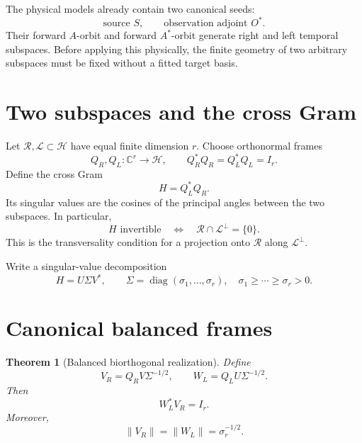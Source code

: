 \documentclass[12pt]{article}
\newtheorem{theorem}{Theorem}[section]
\theoremstyle{remark}
\newcommand{\cH}{\mathcal H}
\newcommand{\cR}{\mathcal R}
\newcommand{\cL}{\mathcal L}
\newcommand{\norm}[1]{\left\lVert#1\right\rVert}
\begin{document}
The physical models already contain two canonical seeds:
\begin{equation}\label{eq:seeds}
 \text{source }S,
 \qquad
 \text{observation adjoint }O^*.
\end{equation}
Their forward $A$-orbit and forward $A^*$-orbit generate right and left
temporal subspaces.  Before applying this physically, the finite geometry of
two arbitrary subspaces must be fixed without a fitted target basis.

\section{Two subspaces and the cross Gram}

Let $\cR,\cL\subset\cH$ have equal finite dimension $r$.  Choose orthonormal
frames
\begin{equation}\label{eq:orthogonal-frames}
 Q_R,Q_L:\mathbb C^r\longrightarrow\cH,
 \qquad Q_R^*Q_R=Q_L^*Q_L=I_r.
\end{equation}
Define the cross Gram
\begin{equation}\label{eq:cross-gram}
 H=Q_L^*Q_R.
\end{equation}
Its singular values are the cosines of the principal angles between the two
subspaces.  In particular,
\begin{equation}\label{eq:transverse}
 H\text{ invertible}
 \quad\Longleftrightarrow\quad
 \cR\cap\cL^\perp=\{0\}.
\end{equation}
This is the transversality condition for a projection onto $\cR$ along
$\cL^\perp$.

Write a singular-value decomposition
\begin{equation}\label{eq:svd}
 H=U\Sigma V^*,
 \qquad
 \Sigma=\operatorname{diag}(\sigma_1,\ldots,\sigma_r),
 \quad \sigma_1\ge\cdots\ge\sigma_r>0.
\end{equation}

\section{Canonical balanced frames}

\begin{theorem}[Balanced biorthogonal realization]\label{thm:balanced}
Define
\begin{equation}\label{eq:balanced-frames}
 V_R=Q_RV\Sigma^{-1/2},
 \qquad
 W_L=Q_LU\Sigma^{-1/2}.
\end{equation}
Then
\begin{equation}\label{eq:biorthogonality}
 W_L^*V_R=I_r.
\end{equation}
Moreover,
\begin{equation}\label{eq:balanced-norms}
 \norm{V_R}=\norm{W_L}=\sigma_r^{-1/2}.
\end{equation}
\end{theorem}
\end{document}
